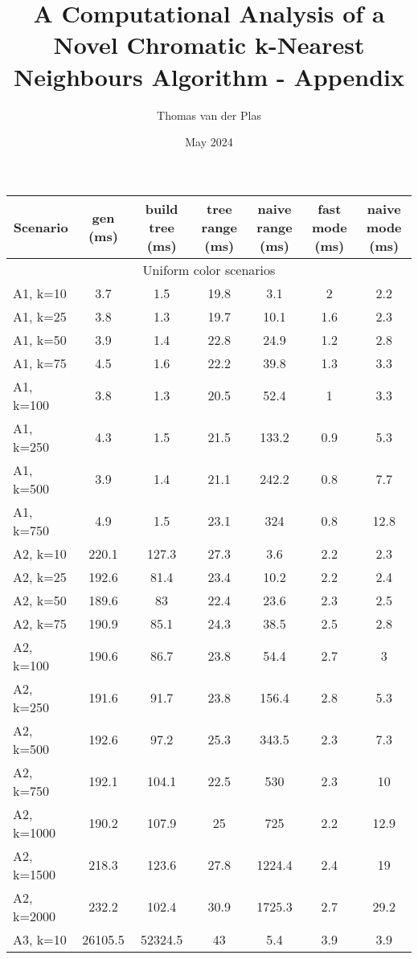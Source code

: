 \documentclass{article}
\title{A Computational Analysis of a Novel Chromatic k-Nearest Neighbours Algorithm - Appendix}
\author{Thomas van der Plas}
\date{May 2024}
\begin{document}
\maketitle
{}
\begin{center}
\begin{table}[h]
    \hskip0.8cm
    \begin{tabular}{|l||c|c|c|c|c|c|}
    \hline
    \multicolumn{1}{|c|}{Scenario} & gen (ms) & build tree (ms) & tree range (ms) & naive range (ms) & fast mode (ms) & naive mode (ms) \\
    \hline
    \hline
    \multicolumn{7}{|c|}{Uniform color scenarios} \\
    \hline
    A1, k=10 & 3.7 & 1.5 & 19.8 & 3.1 & 2 & 2.2\\
    A1, k=25 & 3.8 & 1.3 & 19.7 & 10.1 & 1.6 & 2.3\\
    A1, k=50 & 3.9 & 1.4 & 22.8 & 24.9 & 1.2 & 2.8\\
    A1, k=75 & 4.5 & 1.6 & 22.2 & 39.8 & 1.3 & 3.3\\
    A1, k=100 & 3.8 & 1.3 & 20.5 & 52.4 & 1 & 3.3\\
    A1, k=250 & 4.3 & 1.5 & 21.5 & 133.2 & 0.9 & 5.3\\
    A1, k=500 & 3.9 & 1.4 & 21.1 & 242.2 & 0.8 & 7.7\\
    A1, k=750 & 4.9 & 1.5 & 23.1 & 324 & 0.8 & 12.8\\
    \hline
    A2, k=10 & 220.1 & 127.3 & 27.3 & 3.6 & 2.2 & 2.3\\
    A2, k=25 & 192.6 & 81.4 & 23.4 & 10.2 & 2.2 & 2.4\\
    A2, k=50 & 189.6 & 83 & 22.4 & 23.6 & 2.3 & 2.5\\
    A2, k=75 & 190.9 & 85.1 & 24.3 & 38.5 & 2.5 & 2.8\\
    A2, k=100 & 190.6 & 86.7 & 23.8 & 54.4 & 2.7 & 3\\
    A2, k=250 & 191.6 & 91.7 & 23.8 & 156.4 & 2.8 & 5.3\\
    A2, k=500 & 192.6 & 97.2 & 25.3 & 343.5 & 2.3 & 7.3\\
    A2, k=750 & 192.1 & 104.1 & 22.5 & 530 & 2.3 & 10\\
    A2, k=1000 & 190.2 & 107.9 & 25 & 725 & 2.2 & 12.9\\
    A2, k=1500 & 218.3 & 123.6 & 27.8 & 1224.4 & 2.4 & 19\\
    A2, k=2000 & 232.2 & 102.4 & 30.9 & 1725.3 & 2.7 & 29.2\\
    \hline
    A3, k=10 & 26105.5 & 52324.5 & 43 & 5.4 & 3.9 & 3.9\\

\end{tabular}
\end{table}
\end{center}
\end{document}

